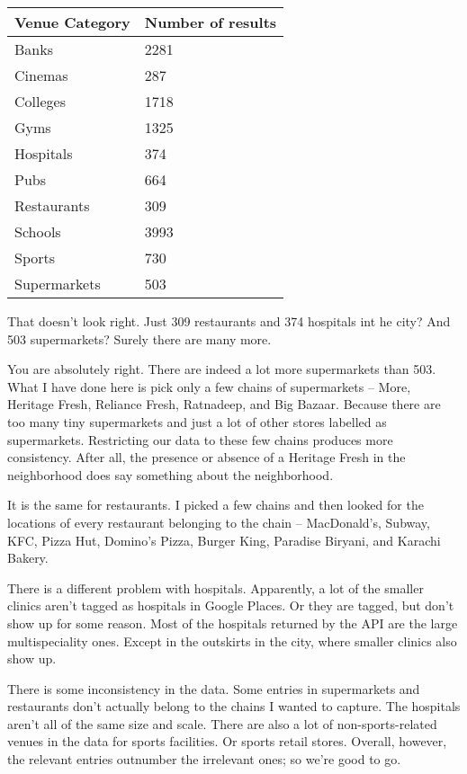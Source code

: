 \begin{tabular}{ll}
\toprule
Venue Category & Number of results \\
\midrule
Banks 		& 2281 \\
Cinemas		& 287 \\
Colleges 	& 1718 \\
Gyms 		& 1325 \\
Hospitals 	& 374 \\
Pubs		& 664 \\
Restaurants	& 309 \\
Schools 	& 3993 \\
Sports 		& 730  \\
Supermarkets 	& 503 \\
\bottomrule
\end{tabular}

{\color{blue} That doesn't look right. Just 309 restaurants and 374 hospitals int he city? And 503 supermarkets? Surely there are many more.}

You are absolutely right. There are indeed a lot more supermarkets than 503. What I have done here is pick only a few chains of supermarkets -- More, Heritage Fresh, Reliance Fresh, Ratnadeep, and Big Bazaar. Because there are too many tiny supermarkets and just a lot of other stores labelled as supermarkets. Restricting our data to these few chains produces more consistency. After all, the presence or absence of a Heritage Fresh in the neighborhood does say something about the neighborhood. 

It is the same for restaurants. I picked a few chains and then looked for the locations of every restaurant belonging to the chain -- MacDonald's, Subway, KFC, Pizza Hut, Domino's Pizza, Burger King, Paradise Biryani, and Karachi Bakery. 

There is a different problem with hospitals. Apparently, a lot of the smaller clinics aren't tagged as hospitals in Google Places. Or they are tagged, but don't show up for some reason. Most of the hospitals returned by the API are the large multispeciality ones. Except in the outskirts in the city, where smaller clinics also show up.

There is some inconsistency in the data. Some entries in supermarkets and restaurants don't actually belong to the chains I wanted to capture. The hospitals aren't all of the same size and scale. There are also a lot of non-sports-related venues in the data for sports facilities. Or sports retail stores. Overall, however, the relevant entries outnumber the irrelevant ones; so we're good to go.

